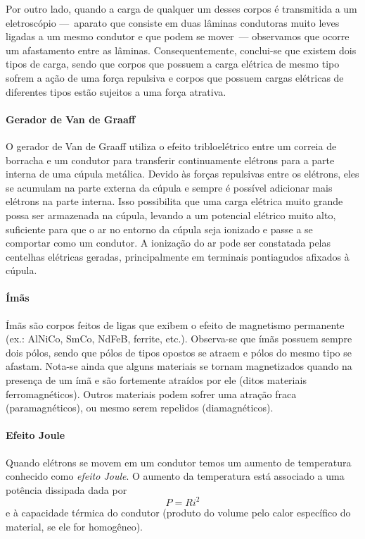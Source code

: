 Por outro lado, quando a carga de qualquer um desses corpos é transmitida a um eletroscópio ---~aparato que consiste em duas lâminas condutoras muito leves ligadas a um mesmo condutor e que podem se mover~--- observamos que ocorre um afastamento entre as lâminas. Consequentemente, conclui-se que existem dois tipos de carga, sendo que corpos que possuem a carga elétrica de mesmo tipo sofrem a ação de uma força repulsiva e corpos que possuem cargas elétricas de diferentes tipos estão sujeitos a uma força atrativa.

\paragraph{Gerador de Van de Graaff}

O gerador de Van de Graaff utiliza o efeito tribloelétrico entre um correia de borracha e um condutor para transferir continuamente elétrons para a parte interna de uma cúpula metálica. Devido às forças repulsivas entre os elétrons, eles se acumulam na parte externa da cúpula e sempre é possível adicionar mais elétrons na parte interna. Isso possibilita que uma carga elétrica muito grande possa ser armazenada na cúpula, levando a um potencial elétrico muito alto, suficiente para que o ar no entorno da cúpula seja ionizado e passe a se comportar como um condutor. A ionização do ar pode ser constatada pelas centelhas elétricas geradas, principalmente em terminais pontiagudos afixados à cúpula.

\paragraph{Ímãs}

Ímãs são corpos feitos de ligas que exibem o efeito de magnetismo permanente (ex.: AlNiCo, SmCo, NdFeB, ferrite, etc.). Observa-se que ímãs possuem sempre dois pólos, sendo que pólos de tipos opostos se atraem e pólos do mesmo tipo se afastam. Nota-se ainda que alguns materiais se tornam magnetizados quando na presença de um ímã e são fortemente atraídos por ele (ditos materiais ferromagnéticos). Outros materiais podem sofrer uma atração fraca (paramagnéticos), ou mesmo serem repelidos (diamagnéticos).

\paragraph{Efeito Joule}

Quando elétrons se movem em um condutor temos um aumento de temperatura conhecido como \emph{efeito Joule}. O aumento da temperatura está associado a uma potência dissipada dada por 
\begin{equation}
    P = R i^2
\end{equation}
%
e à capacidade térmica do condutor (produto do volume pelo calor específico do material, se ele for homogêneo).

